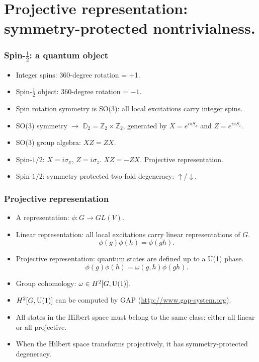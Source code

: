 \documentclass[xcolor=table, 10pt, aspectratio=43]{beamer}
\begin{document}
\section{Projective representation: symmetry-protected nontrivialness.}

\begin{frame}
\frametitle{Spin-$\frac12$: a quantum object}
\begin{itemize}
  \item Integer spins: 360-degree rotation = +1.
  \item Spin-$\frac12$ object: 360-degree rotation = $-1$.
  \item Spin rotation symmetry is SO(3): all local excitations carry integer spins.
\item SO(3) symmetry $\rightarrow$ $\mathbb D_2=\mathbb Z_2\times\mathbb Z_2$, generated by $X=e^{i\pi S_x}$ and $Z=e^{i\pi S_z}$.
\item SO(3) group algebra: $XZ = ZX$.
\item Spin-$1/2$: $X=i\sigma_x$, $Z=i\sigma_z$. $XZ=-ZX$. Projective representation.
\item Spin-$1/2$: symmetry-protected two-fold degeneracy: $\uparrow$/$\downarrow$.
\end{itemize}
\begin{center}
  \begin{animateinline}{25}
  \end{animateinline}
\end{center}
\end{frame}

\begin{frame}
\frametitle{Projective representation}
\begin{itemize}
  \item A representation: $\phi: G\rightarrow GL(V)$.
  \item Linear representation: all local excitations carry linear representations of $G$.
  \[\phi(g)\phi(h) = \phi(gh).\]
  \item Projective representation: quantum states are defined up to a U(1) phase.
  \[\phi(g)\phi(h)=\omega(g, h)\phi(gh).\]
  \item Group cohomology: $\omega\in H^2[G, \text U(1)]$.
  \item $H^2[G, \text U(1)]$ can be computed by GAP (\url{http://www.gap-system.org}).
  \item All states in the Hilbert space must belong to the same class: either all linear or all projective.
  \item When the Hilbert space transforms projectively, it has symmetry-protected degeneracy.
\end{itemize}
\end{frame}
\end{document}

